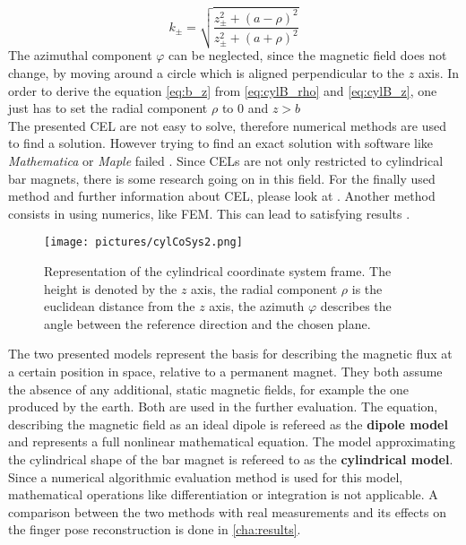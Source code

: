 \begin{equation*}
k_{\pm} = \sqrt{\frac{z_{\pm}^2 + (a-\rho)^2}{z_{\pm}^2 + (a+\rho)^2}}
\end{equation*}
The azimuthal component $ \varphi $ can be neglected, since the magnetic field does not change, by moving around a circle which is aligned perpendicular to the $ z $ axis. In order to derive the equation \ref{eq:b_z} from \ref{eq:cylB_rho} and \ref{eq:cylB_z}, one just has to set the radial component $ \rho $ to 0 and $ z > b $\\
The presented \ac{CEL} are not easy to solve, therefore numerical methods are used to find a solution. However trying to find an exact solution with software like \textit{Mathematica} or \textit{Maple} failed \cite{camacho2013alternative}. Since \acp{CEL} are not only restricted to cylindrical bar magnets, there is some research going on in this field. For the finally used method and further information about \ac{CEL}, please look at \cite{derby2010cylindrical}. Another method consists in using numerics, like \ac{FEM}. This can lead to satisfying results \cite{mladenovic2009magnetic}.
\begin{figure}[b]
\centering
\texttt{[image: pictures/cylCoSys2.png]}
\caption[Cylindrical coordinate frame]{Representation of the cylindrical coordinate system frame. The height is denoted by the $ z $ axis, the radial component $ \rho $ is the euclidean distance from the $ z $ axis, the azimuth $ \varphi $ describes the angle between the reference direction and the chosen plane. \cite{derby2010cylindrical}}
\label{fig:cylCoSys}
\end{figure}
The two presented models represent the basis for describing the magnetic flux at a certain position in space, relative to a permanent magnet. They both assume the absence of any additional, static magnetic fields, for example the one produced by the earth. Both are used in the further evaluation. The equation, describing the magnetic field as an ideal dipole is refereed as the \textbf{dipole model} and represents a full nonlinear mathematical equation. The model approximating the cylindrical shape of the bar magnet is refereed to as the \textbf{cylindrical model}. Since a numerical algorithmic evaluation method is used for this model, mathematical operations like differentiation or integration is not applicable. A comparison between the two methods with real measurements and its effects on the finger pose reconstruction is done in \ref{cha:results}.

\FloatBarrier